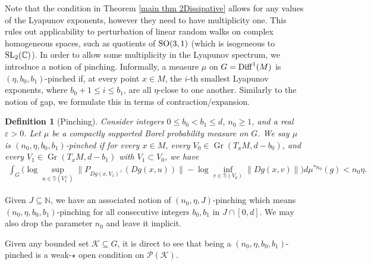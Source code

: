 \documentclass[11pt, leqno, fleqn]{amsart}
\def\eps{\varepsilon}
\def\SL{   {\rm SL}}
\def\SO{   {\rm SO}}
\def \N{{\mathbb N}}
\DeclareMathOperator{\Gr}{Gr}
\newcommand{\cP}{{\mathcal P}}
\newcommand{\cK}{{\mathcal K}}
\newcommand{\C}{{\mathbb C}}
\newcommand{\aryst}{\begin{eqnarray*}}
\newcommand{\earyst}{\end{eqnarray*}}
\newtheorem{defi}[thm]{\bf Definition}
\theoremstyle{definition}
\theoremstyle{definition}
\def\S{ {\mathbb{S}} }
\newcommand{\Diff}{{\rm Diff}}
\begin{document}
Note that the condition in Theorem \ref{main thm 2Dissipative} allows for any values of the Lyapunov exponents, however they  need to have multiplicity one. This rules out applicability to perturbation of linear random walks on complex homogeneous spaces, such as quotients of $\SO(3,1)$ (which is isogeneous to $\SL_{2}(\C)$). 
In order to allow some multiplicity in the Lyapunov spectrum, we introduce  a notion of pinching. Informally, a measure $\mu$ on $G=\Diff^1(M)$ is $(\eta, b_{0}, b_{1})$-pinched if, at every point $x\in M$, the $i$-th smallest Lyapunov exponents, where $b_{0}+1 \leq i\leq b_{1}$, are all $\eta$-close to one another. Similarly to the notion of gap, we formulate this in terms of contraction/expansion.






\begin{defi}[Pinching] \label{def pinch}
	Consider   integers $0 \leq b_0  < b_1 \leq d$,  $n_0 \geq 1$, and a real $\eps > 0$. 
	Let $\mu$ be a compactly supported Borel probability measure on $G$. We say $\mu$  is { \em $(n_0, \eta, b_0, b_1)$-pinched} if for every $x \in M$, every $V_0 \in \Gr(T_xM, d - b_0)$, and every $V_1 \in \Gr(T_xM,  d - b_1)$ with $V_1 \subset V_0$, we have
	\aryst
		\int_{G}  \Big ( \log \sup_{u \in \S(  V_1^{\perp})}  \| P_{  Dg(x, V_{1})^{\perp}}(  Dg(x, u) ) \|  - \log \inf_{v \in \S(V_0)}  \| Dg(x, v) \|    \Big ) d\mu^{* n_0}(g)   < n_0 \eta.
	\earyst
\end{defi}
  
Given $J\subseteq \N$, we have an associated notion of $(n_0, \eta, J)$-pinching which means $(n_0, \eta, b_{0},b_{1})$-pinching for all consecutive integers $b_{0},b_{1}$ in $J\cap [0, d]$. We may also drop the parameter $n_{0}$ and leave it  implicit.
  
Given any bounded set $\cK\subseteq G$, it is direct to see that  being a  $(n_0, \eta, b_{0},b_{1})$-pinched is a weak-$\star$  open condition on $\cP(\cK)$.  
\end{document}
